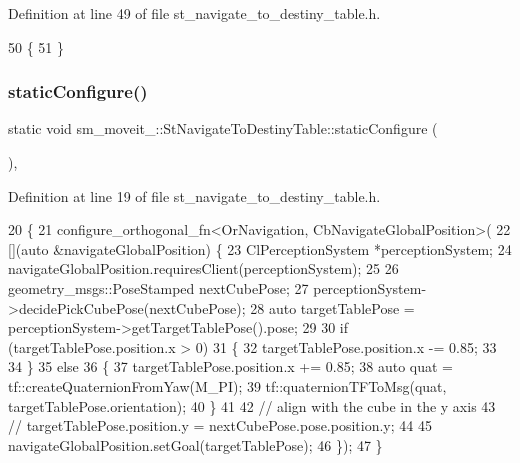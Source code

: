 Definition at line 49 of file st\+\_\+navigate\+\_\+to\+\_\+destiny\+\_\+table.\+h.


\begin{DoxyCode}
50         \{
51         \}
\end{DoxyCode}
\mbox{\label{structsm__moveit__4_1_1StNavigateToDestinyTable_a2a53aaa5ef99206441170e41e59462e9}} 
\subsubsection{\texorpdfstring{static\+Configure()}{staticConfigure()}}
{\footnotesize\ttfamily static void sm\+\_\+moveit\+\_\+::\+St\+Navigate\+To\+Destiny\+Table\+::static\+Configure (\begin{DoxyParamCaption}{ }\end{DoxyParamCaption})\hspace{0.3cm}{\ttfamily [inline]}, {\ttfamily [static]}}



Definition at line 19 of file st\+\_\+navigate\+\_\+to\+\_\+destiny\+\_\+table.\+h.


\begin{DoxyCode}
20         \{
21             configure\_orthogonal\_fn<OrNavigation, CbNavigateGlobalPosition>(
22                 [](\textcolor{keyword}{auto} &navigateGlobalPosition) \{
23                     ClPerceptionSystem *perceptionSystem;
24                     navigateGlobalPosition.requiresClient(perceptionSystem);
25 
26                     geometry\_msgs::PoseStamped nextCubePose;
27                     perceptionSystem->decidePickCubePose(nextCubePose);
28                     \textcolor{keyword}{auto} targetTablePose = perceptionSystem->getTargetTablePose().pose;
29 
30                     \textcolor{keywordflow}{if} (targetTablePose.position.x > 0)
31                     \{
32                         targetTablePose.position.x -= 0.85;
33                         
34                     \}
35                     \textcolor{keywordflow}{else}
36                     \{
37                         targetTablePose.position.x += 0.85;
38                         \textcolor{keyword}{auto} quat = tf::createQuaternionFromYaw(M\_PI);
39                         tf::quaternionTFToMsg(quat, targetTablePose.orientation);
40                     \}
41 
42                     \textcolor{comment}{// align with the cube in the y axis}
43                     \textcolor{comment}{// targetTablePose.position.y = nextCubePose.pose.position.y;}
44 
45                     navigateGlobalPosition.setGoal(targetTablePose);
46                 \});
47         \}
\end{DoxyCode}


